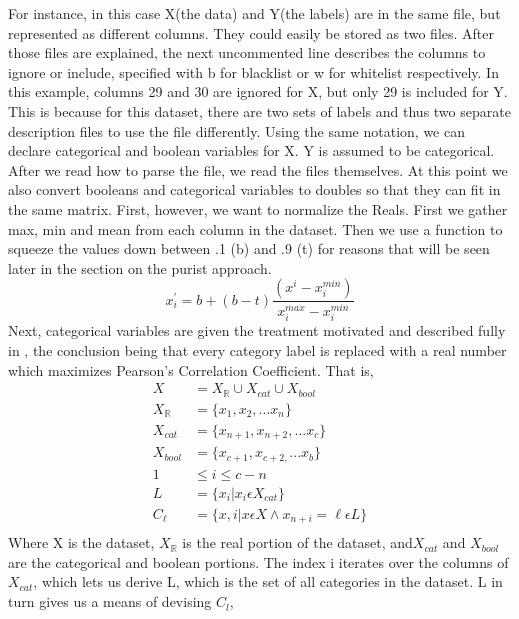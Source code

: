 For instance, in this case X(the data) and Y(the labels) are in the same file,
but represented as different columns.  They could easily be stored as two files.
After those files are explained, the next uncommented line describes the
columns to ignore or include, specified with b for blacklist or w for whitelist
respectively.  In this example, columns 29 and 30 are ignored for X, but only 29
is included for Y.  This is because for this dataset, there are two sets of
labels and thus two separate description files to use the file differently. 
Using the same notation, we can declare categorical and boolean variables for X.
Y is assumed to be categorical.\\
After we read how to parse the file, we read the files themselves.  At this
point we also convert booleans and categorical variables to doubles so that they
can fit in the same matrix.  First, however, we want to normalize the Reals. 
First we gather max, min and mean from each column in the dataset.  Then we use
a function to squeeze the values down between .1 (b) and .9 (t) for reasons that
will be seen later in the section on the purist approach.  
$$x_i^{\prime} = b+(b-t)\frac{(x^i-x_i^{min})}{x_i^{max}-x_i^{min}}$$ Next,
categorical variables are given the treatment motivated and described fully in
\cite{zhang_visual_2015}, the conclusion being that every category label is
replaced with a real number which maximizes Pearson's Correlation Coefficient. 
That is,
\begin{align*}
	X &= {X_\mathbb{R} \cup X_{cat} \cup X_{bool}}\\
X_\mathbb{R} &= \{x_1, x_2, ... x_n\}\\
X_{cat} &= \{x_{n+1}, x_{n+2}, ... x_c\}\\%
X_{bool} &= \{x_{c+1}, x_{c+2,} ... x_b\} \\
1&\leq i \leq c-n\\
L &= \{x_i|x_i\epsilon X_{cat}\}\\%
C_\ell &= \{x, i|  x\epsilon X \wedge x_{n+i} = \ell\epsilon L \}\\%
\end{align*}
Where X is the dataset, $X_\mathbb{R}$ is the real portion of the dataset, and$
X_{cat}$ and $X_{bool}$ are the categorical and boolean portions.  The index i
iterates over the columns of $X_{cat}$, which lets us derive L, which is the set
of all categories in the dataset.  L in turn gives us a means of devising $C_l$,
